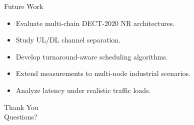 \documentclass[10pt]{beamer}
\begin{document}
\begin{frame}{Future Work}
\begin{itemize}
    \item Evaluate multi-chain DECT-2020 NR architectures.
    \item Study UL/DL channel separation.
    \item Develop turnaround-aware scheduling algorithms.
    \item Extend measurements to multi-node industrial scenarios.
    \item Analyze latency under realistic traffic loads.
\end{itemize}
\end{frame}

\begin{frame}
\centering
\Huge Thank You\\[0.5cm]
\Large Questions?
\end{frame}

\end{document}
